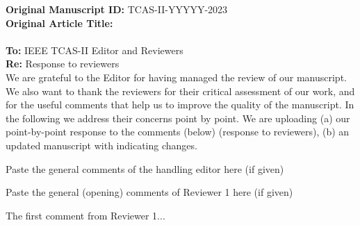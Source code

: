 \documentclass[main.tex]{subfiles}
\begin{document}
\onecolumn
\vspace{2mm}
\noindent \textbf{Original Manuscript ID:} TCAS-II-YYYYY-2023  \\
\textbf{Original Article Title:}   \\
\vspace{2mm}
\\\textbf{To:} IEEE TCAS-II Editor and Reviewers \\
\textbf{Re:} Response to reviewers \\

We are grateful to the Editor for having managed the review of our manuscript. We also want to thank the reviewers for their critical assessment of our work, and for the useful comments that help us to improve the quality of the manuscript.
In the following we address their concerns point by point.
We are uploading (a) our point-by-point response to the comments (below) (response to reviewers), (b) an updated manuscript with  indicating changes.

\editorsection
    Paste the general comments of the handling editor here (if given) \\


\reviewersection
    Paste the general (opening) comments of Reviewer 1 here (if given) \\

\begin{point}
     The first comment from Reviewer 1... \\
\end{point}
\end{document}
